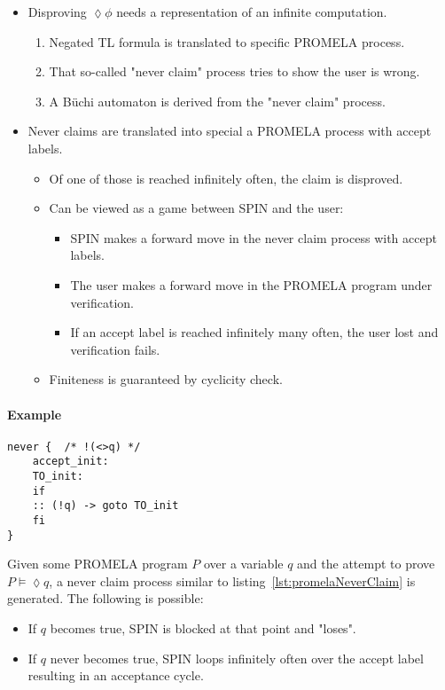 \documentclass[a4paper, 11pt, accentcolor = tud3b]{tudreport}
\newcommand{\sometimes}{\lozenge}
\begin{document}
					\begin{itemize}
						\item Disproving \( \sometimes \phi \) needs a representation of an infinite computation.
							\begin{enumerate}
								\item Negated TL formula is translated to specific PROMELA process.
								\item That so-called "never claim" process tries to show the user is wrong.
								\item A Büchi automaton is derived from the "never claim" process.
							\end{enumerate}
						\item Never claims are translated into special a PROMELA process with accept labels.
							\begin{itemize}
								\item Of one of those is reached infinitely often, the claim is disproved.
								\item Can be viewed as a game between SPIN and the user:
									\begin{itemize}
										\item SPIN makes a forward move in the never claim process with accept labels.
										\item The user makes a forward move in the PROMELA program under verification.
										\item If an accept label is reached infinitely many often, the user lost and verification fails.
									\end{itemize}
								\item Finiteness is guaranteed by cyclicity check.
							\end{itemize}
					\end{itemize}
				
					\paragraph{Example}
						\begin{lstlisting}[caption = { Never Claim PROMELA Process }, label = lst:promelaNeverClaim, language = PROMELA]
never {  /* !(<>q) */
	accept_init:
	TO_init:
	if
	:: (!q) -> goto TO_init
	fi
}
						\end{lstlisting}
					
						Given some PROMELA program \(P\) over a variable \(q\) and the attempt to prove \( P \models \sometimes q \), a never claim process similar to listing~\ref{lst:promelaNeverClaim} is generated. The following is possible:
						\begin{itemize}
							\item If \(q\) becomes true, SPIN is blocked at that point and "loses".
							\item If \(q\) never becomes true, SPIN loops infinitely often over the accept label resulting in an acceptance cycle.
						\end{itemize}
					
\end{document}
